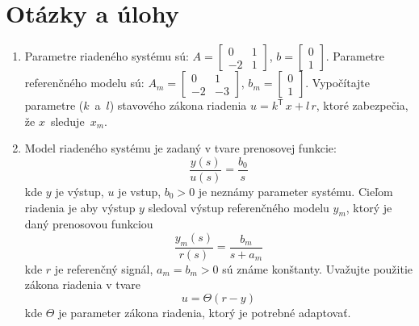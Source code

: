 \documentclass[a4paper, 10pt, ]{article}
\begin{document}
\section{Otázky a úlohy}







\begin{enumerate}[leftmargin=0pt, labelsep=4mm, itemsep=0pt]


    \item Parametre riadeného systému sú: $\displaystyle A = \begin{bmatrix} 0 & 1 \\ -2 & 1 \end{bmatrix}$, $\displaystyle b = \begin{bmatrix} 0  \\  1 \end{bmatrix}$. Parametre referenčného modelu sú: $\displaystyle A_m = \begin{bmatrix} 0 & 1 \\ -2 & -3 \end{bmatrix}$, $\displaystyle b_m = \begin{bmatrix} 0  \\  1 \end{bmatrix}$. Vypočítajte parametre ($k$~a~$l$) stavového zákona riadenia $u = k^\mathsf{T}\, x + l\,r$, ktoré zabezpečia, že $x$~sleduje~$x_m$.


    \bigskip




    \item Model riadeného systému je zadaný v tvare prenosovej funkcie:
    		\begin{equation*}
    			\frac{y(s)}{u(s)} = \frac{b_0}{s}
    		\end{equation*}
    	kde $y$ je výstup, $u$ je vstup, $b_0 > 0$ je neznámy parameter systému. Cieľom riadenia je aby výstup $y$ sledoval výstup referenčného modelu $y_m$, ktorý je daný prenosovou funkciou
    	\begin{equation*}
    			\frac{y_m(s)}{r(s)} = \frac{b_m}{s + a_m}
    		\end{equation*}
    		kde $r$ je referenčný signál, $a_m = b_m > 0$ sú známe konštanty. Uvažujte použitie zákona riadenia v tvare
    		\begin{equation*}
    			u = \Theta (r - y)
    		\end{equation*}
    		kde $\Theta$ je parameter zákona riadenia, ktorý je potrebné adaptovať.


\end{enumerate}
\end{document}
